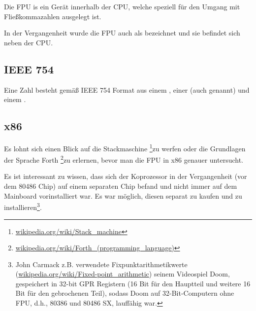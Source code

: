 \mysection{\FPUChapterName}
\label{sec:FPU}

\newcommand{\FNURLSTACK}{\footnote{\href{http://go.yurichev.com/17123}{wikipedia.org/wiki/Stack\_machine}}}
\newcommand{\FNURLFORTH}{\footnote{\href{http://go.yurichev.com/17124}{wikipedia.org/wiki/Forth\_(programming\_language)}}}
\newcommand{\FNURLIEEE}{\footnote{\href{http://go.yurichev.com/17125}{wikipedia.org/wiki/IEEE\_floating\_point}}}
\newcommand{\FNURLSP}{\footnote{\href{http://go.yurichev.com/17126}{wikipedia.org/wiki/Single-precision\_floating-point\_format}}}
\newcommand{\FNURLDP}{\footnote{\href{http://go.yurichev.com/17127}{wikipedia.org/wiki/Double-precision\_floating-point\_format}}}
\newcommand{\FNURLEP}{\footnote{\href{http://go.yurichev.com/17128}{wikipedia.org/wiki/Extended\_precision}}}

Die \ac{FPU} is ein Gerät innerhalb der \ac{CPU}, welche speziell für den Umgang
mit Fließkommazahlen ausgelegt ist. 

In der Vergangenheit wurde die \ac{FPU} auch als  bezeichnet und
sie befindet sich neben der \ac{CPU}. 

\subsection{IEEE 754}

Eine Zahl besteht gemäß IEEE 754 Format aus einem , einer
 (auch  genannt) und einem . 

\subsection{x86}

Es lohnt sich einen Blick auf die Stackmaschine \FNURLSTACK zu werfen oder die
Grundlagen der Sprache Forth \FNURLFORTH zu erlernen, bevor man die \ac{FPU} in
x86 genauer untersucht. 

Es ist interessant zu wissen, dass sich der Koprozessor in der Vergangenheit
(vor dem 80486 Chip) auf einem separaten Chip befand und nicht immer auf dem
Mainboard vorinstalliert war. Es war möglich, diesen separat zu kaufen und zu
installieren\footnote{John Carmack z.B. verwendete Fixpunktarithmetikwerte 
(\href{http://go.yurichev.com/17356}{wikipedia.org/wiki/Fixed-point\_arithmetic})
seinem Videospiel Doom, gespeichert in 32-bit \ac{GPR} Registern (16 Bit
für den Hauptteil und weitere 16 Bit für den gebrochenen Teil), sodass Doom
auf 32-Bit-Computern ohne FPU, d.h., 80386 und 80486 SX, lauffähig war.}.

